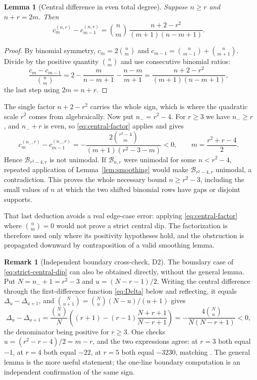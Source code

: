 \documentclass[11pt]{article}
\theoremstyle{research}
\newtheorem{lemma}[theorem]{Lemma}
\theoremstyle{definition}
\newtheorem{remark}[theorem]{Remark}
\newcommand{\TS}{\mathcal B}
\numberwithin{equation}{section}
\begin{document}
\begin{lemma}[Central difference in even total degree]\label{lem:central}
Suppose $n\ge r$ and $n+r=2m$. Then
\begin{equation}\label{eq:central-factor}
 c_m^{(n,r)}-c_{m-1}^{(n,r)}
  =\binom nm\,
     \frac{n+2-r^2}{(m+1)(n-m+1)} .
\end{equation}
\end{lemma}
\begin{proof}
By binomial symmetry, $c_m=2\binom nm$ and
$c_{m-1}=\binom n{m-1}+\binom n{m+1}$.
Divide by the positive quantity $\binom nm$ and use consecutive binomial
ratios:
\[
 \frac{c_m-c_{m-1}}{\binom nm}
  =2-\frac{m}{n-m+1}-\frac{n-m}{m+1}
  =\frac{n+2-r^2}{(m+1)(n-m+1)},
\]
the last step using $2m=n+r$.
\end{proof}

The single factor $n+2-r^2$ carries the whole sign, which is where the
quadratic scale $r^2$ comes from algebraically. Now put $n_-=r^2-4$.
For $r\ge3$ we have $n_-\ge r$, and $n_-+r$ is even, so
\eqref{eq:central-factor} applies and gives
\begin{equation}\label{eq:strict-central-dip}
 c_m^{(n_-,r)}-c_{m-1}^{(n_-,r)}
 =-\frac{2\binom{r^2-4}{m}}{(m+1)(r^2-3-m)}<0,
 \qquad m=\frac{r^2+r-4}{2}.
\end{equation}
Hence $\TS_{r^2-4,r}$ is not unimodal. If $\TS_{n,r}$ were unimodal for
some $n<r^2-4$, repeated application of Lemma~\ref{lem:smoothing} would
make $\TS_{r^2-4,r}$ unimodal, a contradiction. This proves the whole
necessary bound $n\ge r^2-3$, including the small values of $n$ at which
the two shifted binomial rows have gaps or disjoint supports.

That last deduction avoids a real edge-case error: applying
\eqref{eq:central-factor} where $\binom nm=0$ would not prove a strict
central dip. The factorization is therefore used only where its positivity
hypotheses hold, and the obstruction is propagated downward by
contraposition of a valid smoothing lemma.

\begin{remark}[Independent boundary cross-check, D2]\label{rem:boundary-crosscheck}
The boundary case of \eqref{eq:strict-central-dip} can also be obtained
directly, without the general lemma. Put $N=n_-+1=r^2-3$ and
$u=(N-r-1)/2$. Writing the central difference through the first-difference
function \eqref{eq:Delta} below and reflecting, it equals
$\Delta_u-\Delta_{u+1}$, and $\binom N{u+1}=\binom Nu(N-u)/(u+1)$ gives
\begin{equation}\label{eq:centralnegative}
 \Delta_u-\Delta_{u+1}
 =\frac{\binom Nu}{N}
   \left((r+1)-(r-1)\frac{N+r+1}{N-r+1}\right)
 =-\frac{4\binom Nu}{N(N-r+1)}<0,
\end{equation}
the denominator being positive for $r\ge3$. One checks
$u=(r^2-r-4)/2=m-r$, and the two expressions agree: at $r=3$ both equal
$-1$, at $r=4$ both equal $-22$, at $r=5$ both equal $-3230$, matching
. The general lemma is the more useful
statement; the one-line boundary computation is an independent
confirmation of the same sign.
\end{remark}
\end{document}
